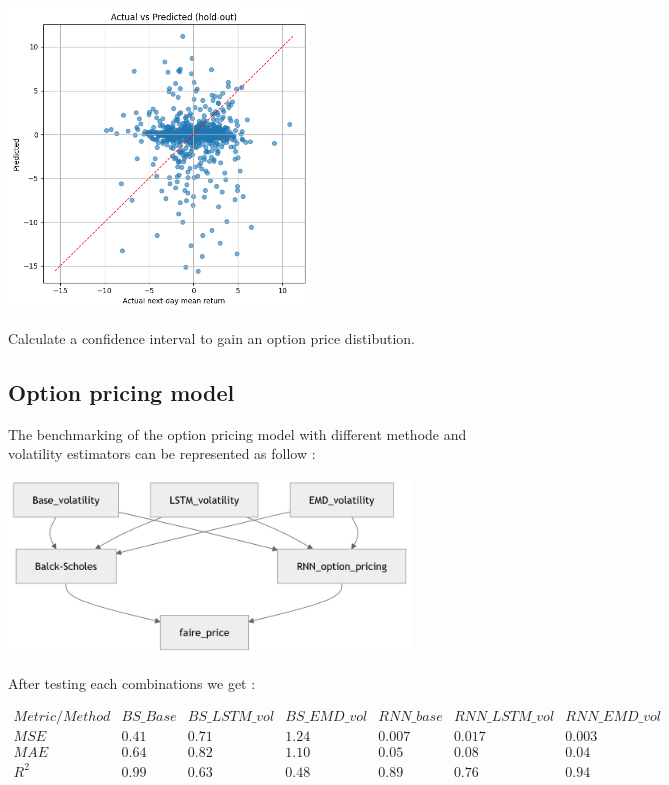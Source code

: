 \documentclass[letterpaper,11pt]{article}
\begin{document}
\begin{center}
\includegraphics[width=0.6\textwidth]{img/plot_prob_model_mean.png}
\end{center}

Calculate a confidence interval to gain an option price distibution.


\subsection*{Option pricing model}

The benchmarking of the option pricing model with different methode and volatility estimators can be represented as follow :

\begin{center}
\includegraphics[width=0.8\textwidth]{img/faire_price_calc.png}
\end{center}

After testing each combinations we get :

\[
\begin{array}{ccccccc}
Metric/Method & BS\_Base & BS\_LSTM\_vol & BS\_EMD\_vol & RNN\_base & RNN\_LSTM\_vol & RNN\_EMD\_vol \\
\hline
MSE & 0.41 & 0.71 & 1.24 & 0.007 & 0.017 & 0.003 \\
MAE & 0.64 & 0.82 & 1.10 & 0.05 & 0.08 & 0.04 \\
R^{2} & 0.99 & 0.63 & 0.48 & 0.89 & 0.76 & 0.94
\end{array}
\]
\bigskip
\end{document}
